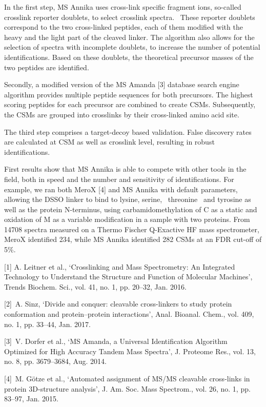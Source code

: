 {In the first step, MS Annika uses cross-link specific fragment ions, so-called crosslink reporter doublets, to select crosslink spectra.  These reporter doublets correspond to the two cross-linked peptides, each of them modified with the heavy and the light part of the cleaved linker. The algorithm also allows for the selection of spectra with incomplete doublets, to increase the number of potential identifications. Based on these doublets, the theoretical precursor masses of the two peptides are identified.

Secondly, a modified version of the MS Amanda [3] database search engine algorithm provides multiple peptide sequences for both precursors. The highest scoring peptides for each precursor are combined to create CSMs. Subsequently, the CSMs are grouped into crosslinks by their cross-linked amino acid site.

The third step comprises a target-decoy based validation. False discovery rates are calculated at CSM as well as crosslink level, resulting in robust identifications.

First results show that MS Annika is able to compete with other tools in the field, both in speed and the number and sensitivity of identifications. For example, we ran both MeroX [4] and MS Annika with default parameters, allowing the DSSO linker to bind to lysine, serine,  threonine  and tyrosine as well as the protein N-terminus, using carbamidomethylation of C as a static and oxidation of M as a variable modification in a sample with two proteins. From 14708 spectra measured on a Thermo Fischer Q-Exactive HF mass spectrometer, MeroX identified 234, while MS Annika identified 282 CSMs at an FDR cut-off of 5\%.

[1] A. Leitner et al., ‘Crosslinking and Mass Spectrometry: An Integrated Technology to Understand the Structure and Function of Molecular Machines’, Trends Biochem. Sci., vol. 41, no. 1, pp. 20–32, Jan. 2016.

[2] A. Sinz, ‘Divide and conquer: cleavable cross-linkers to study protein conformation and protein–protein interactions’, Anal. Bioanal. Chem., vol. 409, no. 1, pp. 33–44, Jan. 2017.

[3] V. Dorfer et al., ‘MS Amanda, a Universal Identification Algorithm Optimized for High Accuracy Tandem Mass Spectra’, J. Proteome Res., vol. 13, no. 8, pp. 3679–3684, Aug. 2014.

[4] M. Götze et al., ‘Automated assignment of MS/MS cleavable cross-links in protein 3D-structure analysis’, J. Am. Soc. Mass Spectrom., vol. 26, no. 1, pp. 83–97, Jan. 2015.


}
